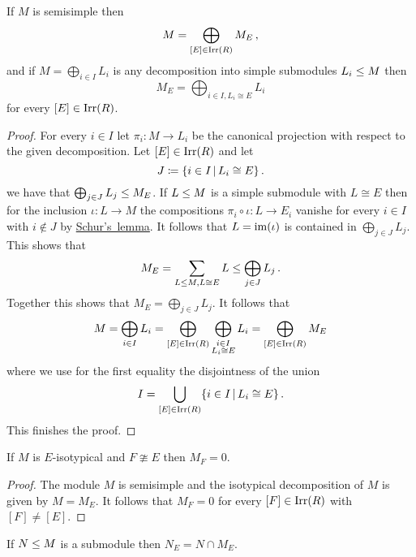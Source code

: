 \begin{theorem}
  \label{theorem: isotypical decomposition}
  If $M$ is semisimple then
  \[
      M
    = \bigoplus_{[E] \in \operatorname{Irr}(R)} M_E \,,
  \]
  and if $M = \bigoplus_{i \in I} L_i$ is any decomposition into simple submodules $L_i \leq M$ then
  \[
      M_E
    = \bigoplus_{i \in I, L_i \cong E} L_i
  \]
  for every $[E] \in \operatorname{Irr}(R)$.
\end{theorem}


\begin{proof}
  For every $i \in I$ let $\pi_i \colon M \to L_i$ be the canonical projection with respect to the given decomposition.
  Let $[E] \in \operatorname{Irr}(R)$ and let
  \[
              J
    \defined  \{
                i \in I
              \suchthat
                L_i \cong E
              \} \,.
  \]
  we have that $\bigoplus_{j \in J} L_j \leq M_E$.
  If $L \leq M$ is a simple submodule with $L \cong E$ then for the inclusion $\iota \colon L \to M$ the compositions $\pi_i \circ \iota \colon L \to E_i$ vanishe for every $i \in I$ with $i \notin J$ by \hyperref[proposition: Schurs lemma for modules]{Schur’s~lemma}.
  It follows that $L = \operatorname{im}(\iota)$ is contained in $\bigoplus_{j \in J} L_j$.
  This shows that
  \[
              M_E
    =         \sum_{L \leq M, L \cong E} L
    \leq \bigoplus_{j \in J} L_j \,.
  \]
  Together this shows that $M_E = \bigoplus_{j \in J} L_j$.
  It follows that
  \[
      M
    = \bigoplus_{i \in I} L_i
    = \bigoplus_{[E] \in \operatorname{Irr}(R)} \bigoplus_{\substack{i \in I \\ L_i \cong E}} L_i
    = \bigoplus_{[E] \in \operatorname{Irr}(R)} M_E
  \]
  where we use for the first equality the disjointness of the union
  \[
                                I
    = \bigcup_{[E] \in \Irr(R)} \{ i \in I \suchthat L_i \cong E \} \,.
  \]
  This finishes the proof.
\end{proof}


\begin{corollary}
  If $M$ is $E$-isotypical and $F \ncong E$ then $M_F = 0$.
\end{corollary}


\begin{proof}
  The module $M$ is semisimple and the isotypical decomposition of $M$ is given by $M = M_E$.
  It follows that $M_F = 0$ for every $[F] \in \operatorname{Irr}(R)$ with $[F] \neq [E]$.
\end{proof}


\begin{lemma}
  If $N \leq M$ is a submodule then $N_E = N \cap M_E$.
\end{lemma}


